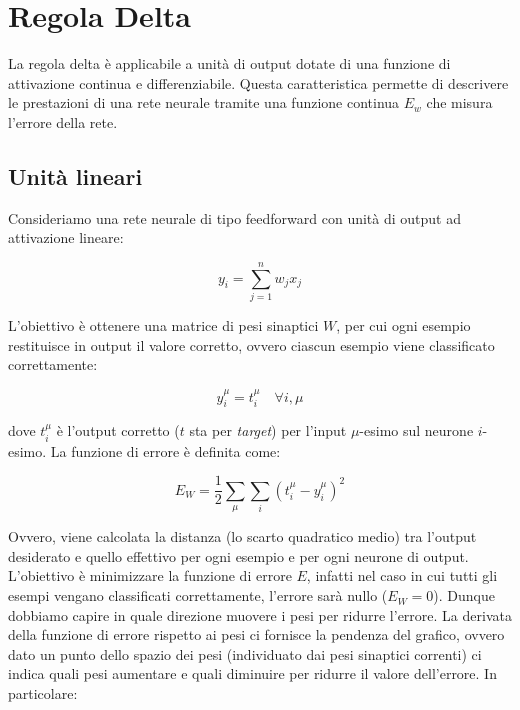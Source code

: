 \section{Regola Delta}

La regola delta è applicabile a unità di output dotate di una funzione di
attivazione continua e differenziabile. Questa caratteristica permette di
descrivere le prestazioni di una rete neurale tramite una funzione continua
$E_w$ che misura l'errore della rete.

\subsection{Unità lineari}

Consideriamo una rete neurale di tipo feedforward con unità di output ad
attivazione lineare:

\begin{equation}
	y_i = \sum_{j=1}^n w_j x_j
\end{equation}

L'obiettivo è ottenere una matrice di pesi sinaptici $W$, per cui ogni esempio
restituisce in output il valore corretto, ovvero ciascun esempio viene
classificato correttamente:

\begin{equation*}
	y^{\mu}_i = t^{\mu}_i \quad \forall i, \mu
\end{equation*}


dove $t^{\mu}_i$ è l'output corretto ($t$ sta per \textit{target}) per l'input $\mu$-esimo sul neurone
$i$-esimo. La funzione di errore è definita come:

\begin{equation}
	E_W = \frac{1}{2} \sum_{\mu} \sum_{i} (t^{\mu}_i - y^{\mu}_i)^2
\end{equation}

Ovvero, viene calcolata la distanza (lo scarto quadratico medio) tra l'output
desiderato e quello effettivo
per ogni esempio e per ogni neurone di output. L'obiettivo è minimizzare la
funzione di errore $E$, infatti nel caso in cui tutti gli esempi vengano
classificati correttamente, l'errore sarà nullo ($E_W = 0$).
Dunque dobbiamo capire in quale direzione muovere i pesi per ridurre l'errore.
La derivata della funzione di errore rispetto ai pesi ci fornisce la pendenza
del grafico, ovvero dato un punto dello spazio dei pesi (individuato dai pesi
sinaptici correnti) ci indica quali pesi aumentare e quali diminuire per ridurre
il valore dell'errore. In particolare:


